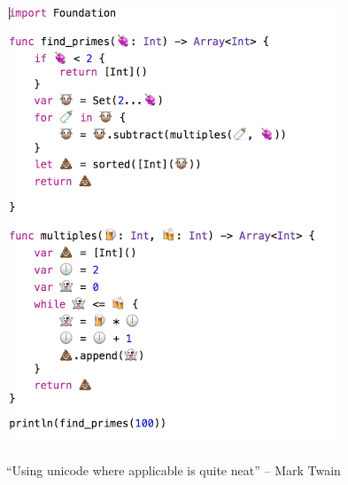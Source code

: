 \documentclass[a4paper]{scrreprt}
\begin{document}
\chapter{}

\chapter{}

\chapter{}

\chapter{}

\chapter{}
\includegraphics[scale=0.6]{swift}

\tiny ``Using unicode where applicable is quite neat'' -- Mark Twain
\chapter{}

\chapter{}

\chapter{}

\chapter{}

\end{document}
